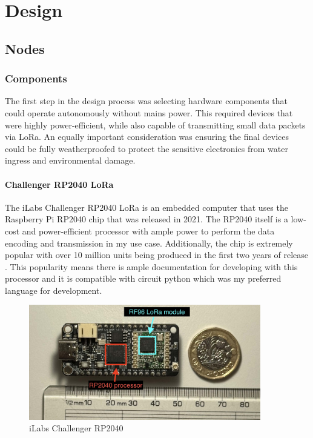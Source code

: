 \section{Design}

\subsection{Nodes}

\subsubsection{Components}

The first step in the design process was selecting hardware components that
could operate autonomously without mains power. This required devices that were
highly power-efficient, while also capable of transmitting small data
packets via LoRa. An equally important consideration was ensuring the final
devices could be fully weatherproofed to protect the sensitive electronics from
water ingress and environmental damage.

\paragraph{Challenger RP2040 LoRa}

The iLabs Challenger RP2040 LoRa is an embedded computer that uses the Raspberry Pi
RP2040 chip that was released in 2021. The RP2040 itself is a low-cost and
power-efficient processor with ample power to perform the data encoding and
transmission in my use case. Additionally, the chip is extremely popular with
over 10 million units being produced in the first two years of release
\cite{pounder2023}. This popularity means there is ample documentation for
developing with this processor and it is compatible with circuit python which was
my preferred language for development.

\begin{figure}[H]
    \centering
    \includegraphics[width=0.9\textwidth]{contents/part-2/fig2/challenger-rp2040.jpg}
    \caption{iLabs Challenger RP2040}
    \label{fig:challenger-rp2040}
\end{figure}


